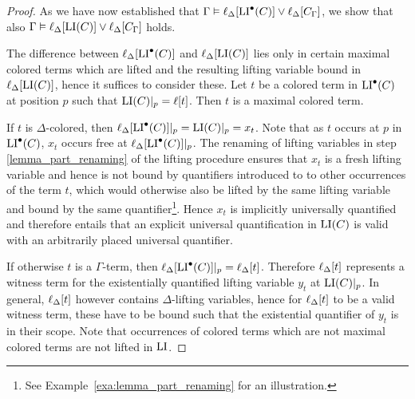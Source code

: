 \begin{proof}

	As we have now established that
	$\Gamma \vDash \ell_{\Delta}[ \operatorname{LI}^\bullet(C) ] \lor \ell_{\Delta}[C_\Gamma]$,
	we show that also
	$\Gamma \vDash \ell_{\Delta}[ \operatorname{LI}(C) ] \lor \ell_{\Delta}[C_\Gamma]$ holds.


	The difference between $\ell_{\Delta}[\operatorname{LI}^\bullet(C)]$ and $\ell_{\Delta}[\operatorname{LI}(C)]$ lies only in certain maximal colored terms which are lifted and the resulting lifting variable bound in $\ell_{\Delta}[\operatorname{LI}(C)]$, hence it suffices to consider these.
	Let $t$ be a colored term in $\operatorname{LI}^\bullet(C)$ at position $p$ such that $\operatorname{LI}(C)|_{p} = \ell[t]$.
	Then $t$ is a maximal colored term. %

	If $t$ is $\Delta$-colored, then $\ell_{\Delta}[\operatorname{LI}^\bullet(C)]|_{p} = \operatorname{LI}(C)|_{p} = x_t$.
	Note that as $t$ occurs at $p$ in $\operatorname{LI}^\bullet(C)$, $x_t$ occurs free at $\ell_{\Delta}[\operatorname{LI}^\bullet(C)]|_{p}$.
	The renaming of lifting variables in step \ref{lemma_part_renaming} of the lifting procedure
	ensures that $x_t$ is a fresh lifting variable and hence is not bound by quantifiers introduced to to other occurrences of the term $t$, which would otherwise also be lifted by the same lifting variable and bound by the same quantifier\footnote{See Example~\ref{exa:lemma_part_renaming} for an illustration.}.
	Hence $x_t$ is implicitly universally quantified and therefore entails that an explicit universal quantification in $\operatorname{LI}(C)$ is valid with an arbitrarily placed universal quantifier. 

	If otherwise $t$ is a $\Gamma$-term, then $\ell_{\Delta}[\operatorname{LI}^\bullet(C)]|_{p} = \ell_{\Delta}[t]$.
	Therefore $\ell_{\Delta}[t]$ represents a witness term for the existentially quantified lifting variable $y_t$ at $\operatorname{LI}(C)|_{p}$.
	In general, $\ell_{\Delta}[t]$ however contains $\Delta$-lifting variables, hence for $\ell_{\Delta}[t]$ to be a valid witness term, these have to be bound such that the existential quantifier of $y_t$ is in their scope.
	Note that occurrences of colored terms which are not maximal colored terms are not lifted in $\operatorname{LI}$.


\end{proof}
